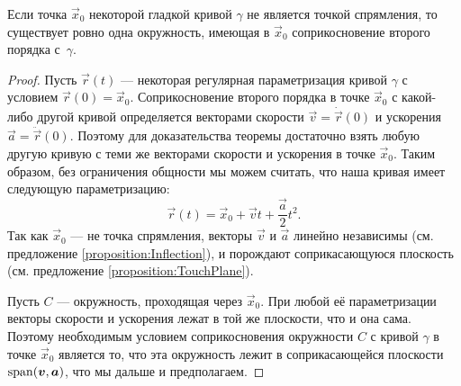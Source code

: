 \begin{theorem}
	Если точка $\vec{x}_0$ некоторой гладкой кривой $\gamma$ не является точкой спрямления, то существует ровно одна окружность, имеющая в $\vec{x}_0$ соприкосновение второго порядка с~$\gamma$.
\end{theorem}

\begin{proof}
	Пусть $\vec{r}(t)$ --- некоторая регулярная параметризация кривой $\gamma$ с условием $\vec{r}(0) = \vec{x}_0$. Соприкосновение второго порядка в точке $\vec{x}_0$ с какой-либо другой кривой определяется векторами скорости $\vec{v} = \dot{\vec{r}}(0)$ и ускорения $\vec{a} = \ddot{\vec{r}}(0)$. Поэтому для доказательства теоремы достаточно взять любую другую кривую с теми же векторами скорости и ускорения в точке $\vec{x}_0$. Таким образом, без ограничения общности мы можем считать, что наша кривая имеет следующую параметризацию:
	\[
		\vec{r}(t) = \vec{x}_0 + \vec{v}t + \frac{\vec{a}}{2}t^2.
	\]
	Так как $\vec{x}_0$ --- не точка спрямления, векторы $\vec{v}$ и $\vec{a}$ линейно независимы (см. предложение \ref{proposition:Inflection}), и порождают соприкасающуюся плоскость (см. предложение \ref{proposition:TouchPlane}).

	Пусть $C$ --- окружность, проходящая через $\vec{x}_0$. При любой её параметризации векторы скорости и ускорения лежат в той же плоскости, что и она сама. Поэтому необходимым условием соприкосновения окружности $C$ с кривой $\gamma$ в точке $\vec{x}_0$ является то, что эта окружность лежит в соприкасающейся плоскости $\operatorname{span}(\boldsymbol{v}, \boldsymbol{a})$, что мы дальше и предполагаем.


\end{proof}
